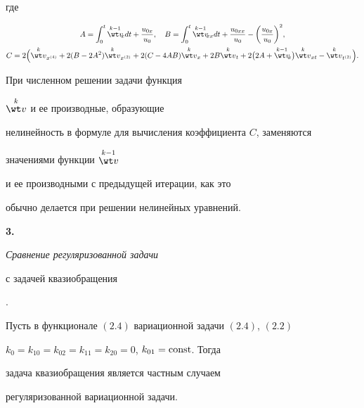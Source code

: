 где 


\begin{gather*} 


A=\int^t_0\up{k-1}{\wt v}_{\!\!x}dt+\frac{u_{0x}}{u_0},\quad 


B=\int^t_0 \up{k-1}{\wt v}_{\!\!xx}dt+ 


\frac{u_{0xx}}{u_0}-\bigg(\frac{u_{0x}}{u_0}\bigg)^2, \\ 


% 


C=2\Big(\up{k}{\wt v}_{x^{(4)}}+2(B-2A^2) 


\up{k}{\wt v}_{x^{(2)}}+2(C-4AB)\up{k}{\wt v}_x+ 


2B\up{k}{\wt v}_t+2\big(2A+\up{k-1}{\wt v}_{\!\!x}\big) 


\up{k}{\wt v}_{xt}-\up{k}{\wt v}_{t^{(2)}}\Big). 


\end{gather*} 


При численном решении задачи функция 


$\up{k}{\wt v}$ и ее производные, образующие 


нелинейность в формуле для вычисления коэффициента $C$, заменяются 


значениями функции $\up{k-1}{\wt v}$ 


и ее производными с предыдущей итерации, как это 


обычно делается при решении нелинейных уравнений. 


\medskip 


 


{\bf 3.} {\it Сравнение регуляризованной задачи 


с задачей квазиобращения}. 


 


\begin{thm} 


Пусть в функционале $(2.4)$ вариационной задачи $(2.4)$, $(2.2)$ 


$k_0=k_{10}=k_{02}=k_{11}=k_{20}=0$, $k_{01}=\operatorname{const}$. Тогда 


задача квазиобращения является частным случаем 


регуляризованной вариационной задачи. 


\end{thm} 


 


